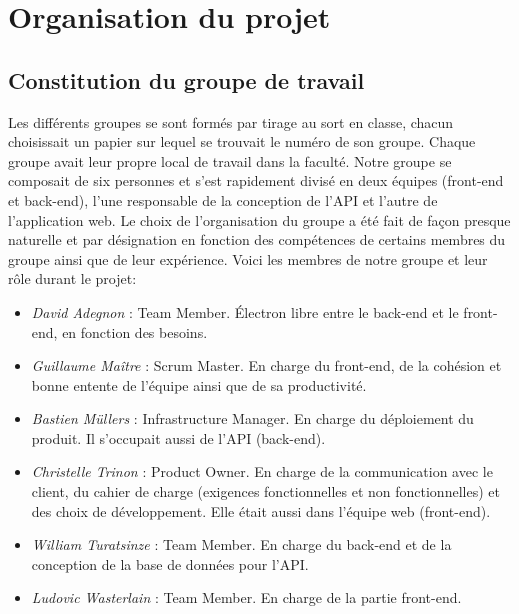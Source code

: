 \documentclass[t, 12pt, usenames,dvipsnames]{article}
\begin{document}
    \section{Organisation du projet}

        \subsection{Constitution du groupe de travail}
            \noindent Les différents groupes se sont formés par tirage au sort en classe, chacun choisissait un papier sur lequel se trouvait le numéro de son groupe. Chaque groupe avait leur propre local de travail dans la faculté. Notre groupe se composait de six personnes et s'est rapidement divisé en deux équipes (front-end et back-end), l'une responsable de la conception de l'API et l'autre de l'application web. Le choix de l'organisation du groupe a été fait de façon presque naturelle et par désignation en fonction des compétences de certains membres du groupe ainsi que de leur expérience. Voici les membres de notre groupe et leur rôle durant le projet:
                \begin{itemize}
                    \item \textit{David Adegnon} : Team Member. Électron libre entre le back-end et le front-end, en fonction des besoins.
                    \item \textit{Guillaume Maître} : Scrum Master. En charge du front-end, de la cohésion et bonne entente de l'équipe ainsi que de sa productivité.
                    \item \textit{Bastien Müllers} : Infrastructure Manager.  En charge du déploiement du produit. Il s'occupait aussi de l'API (back-end).
                    \item \textit{Christelle Trinon} : Product Owner. En charge de la communication avec le client, du cahier de charge (exigences fonctionnelles et non fonctionnelles) et des choix de développement. Elle était aussi dans l'équipe web (front-end).
                    \item \textit{William Turatsinze} : Team Member. En charge du back-end et de la conception de la base de données pour l'API.
                    \item \textit{Ludovic Wasterlain} : Team Member. En charge de la partie front-end.
                \end{itemize}
                
\end{document}

